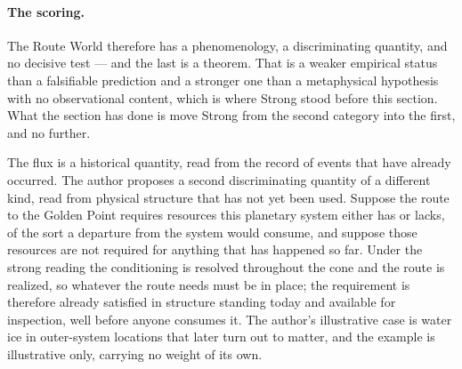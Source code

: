 \paragraph{The scoring.} The Route World therefore has a phenomenology, a
discriminating quantity, and no decisive test --- and the last is a
theorem. That is a weaker empirical status than a falsifiable prediction
and a stronger one than a metaphysical hypothesis with no observational
content, which is where Strong stood before this section. What the
section has done is move Strong from the second category into the first,
and no further.

\begin{remark}
\label{rw:rem:preposition}
The flux is a historical quantity, read from the record of events
that have already occurred. The author proposes a second
discriminating quantity of a different kind, read from physical
structure that has not yet been used. Suppose the route to the
Golden Point requires resources this planetary system either has or
lacks, of the sort a departure from the system would consume, and
suppose those resources are not required for anything that has
happened so far. Under the strong reading the conditioning is
resolved throughout the cone and the route is realized, so whatever
the route needs must be in place; the requirement is therefore
already satisfied in structure standing today and available for
inspection, well before anyone consumes it. The author's
illustrative case is water ice in outer-system locations that later
turn out to matter, and the example is illustrative only, carrying
no weight of its own.


\end{remark}
